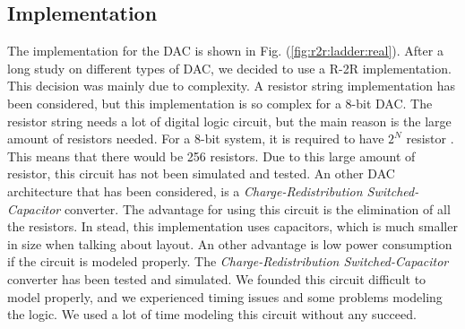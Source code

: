 \documentclass[english, 12pt, a4paper]{ifimaster}
\begin{document}
\subsection{Implementation}
The implementation for the DAC is shown in Fig. (\ref{fig:r2r:ladder:real}). After a long study on different types of DAC, we decided to use a R-2R implementation. This decision was mainly due to 
complexity. A resistor string implementation has been considered, but this implementation is so complex for a 8-bit DAC. The resistor string needs a lot of digital logic circuit, but the main 
reason is the large amount of resistors needed. For a 8-bit system, it is required to have \(2^N\) resistor \cite{carusone}. This means that there would be 256 resistors. Due to this large amount of resistor, 
this circuit has not been simulated and tested. An other DAC architecture that has been considered, is a \textit{Charge-Redistribution Switched-Capacitor} converter. The advantage for using this circuit 
is the elimination of all the resistors. In stead, this implementation uses capacitors, which is much smaller in size when talking about layout. An other advantage is low power consumption if the
circuit is modeled properly. The \textit{Charge-Redistribution Switched-Capacitor} converter has been tested and simulated. We founded this circuit difficult to model properly, and we experienced 
timing issues and some problems modeling the logic. We used a lot of time modeling this circuit without any succeed.\\
\end{document}
